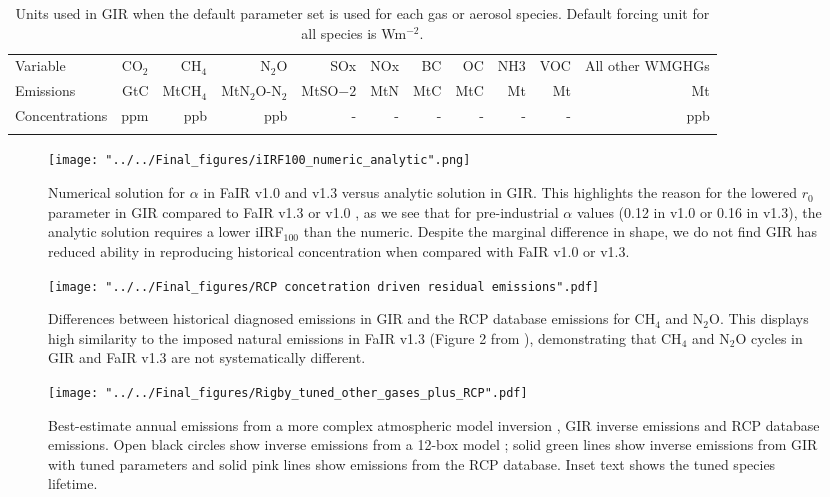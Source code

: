 \documentclass[gmd, manuscript]{copernicus}
\begin{document}
\begin{table}[t]
    \caption{Units used in GIR when the default parameter set is used for each gas or aerosol species. Default forcing unit for all species is Wm$^{-2}$.} \label{tab:units}
    \begin{tabular}{l r r r r r r r r r r}
    \tophline
    Variable & CO$_2$ & CH$_4$ & N$_2$O & SOx & NOx & BC & OC & NH3 & VOC & All other WMGHGs\\
    \middlehline
    Emissions & GtC & MtCH$_4$ & MtN$_2$O-N$_2$ & MtSO$-2$ & MtN & MtC & MtC & Mt & Mt & Mt  \\
    Concentrations & ppm & ppb & ppb & - & - & - & - & - & - & ppb \\
    \bottomhline
    \end{tabular}
    \belowtable{} %
\end{table}

\begin{figure}[t]
    \texttt{[image: "../../Final\_figures/iIRF100\_numeric\_analytic".png]}
    \caption{Numerical solution for $\alpha$ in FaIR v1.0 and v1.3 versus analytic solution in GIR. This highlights the reason for the lowered $r_0$ parameter in GIR compared to FaIR v1.3 \citep{Smith2017} or v1.0 \citep{Millar2016}, as we see that for pre-industrial $\alpha$ values (0.12 in v1.0 or 0.16 in v1.3), the analytic solution requires a lower iIRF$_{100}$ than the numeric. Despite the marginal difference in shape, we do not find GIR has reduced ability in reproducing historical concentration when compared with FaIR v1.0 or v1.3.}
\end{figure}

\begin{figure}[t]
    \texttt{[image: "../../Final\_figures/RCP concetration driven residual emissions".pdf]}
    \caption{Differences between historical diagnosed emissions in GIR and the RCP database emissions for CH$_4$ and N$_2$O. This displays high similarity to the imposed natural emissions in FaIR v1.3 (Figure 2 from \cite{Smith2017}), demonstrating that CH$_4$ and N$_2$O cycles in GIR and FaIR v1.3 are not systematically different.}
\end{figure}

\begin{figure}[t]
    \texttt{[image: "../../Final\_figures/Rigby\_tuned\_other\_gases\_plus\_RCP".pdf]}
    \caption{Best-estimate annual emissions from a more complex atmospheric model inversion \cite{Rigby2014}, GIR inverse emissions and RCP database emissions. Open black circles show inverse emissions from a 12-box model \cite{Cunnold1994}; solid green lines show inverse emissions from GIR with tuned parameters and solid pink lines show emissions from the RCP database. Inset text shows the tuned species lifetime.}
\end{figure}
\end{document}
